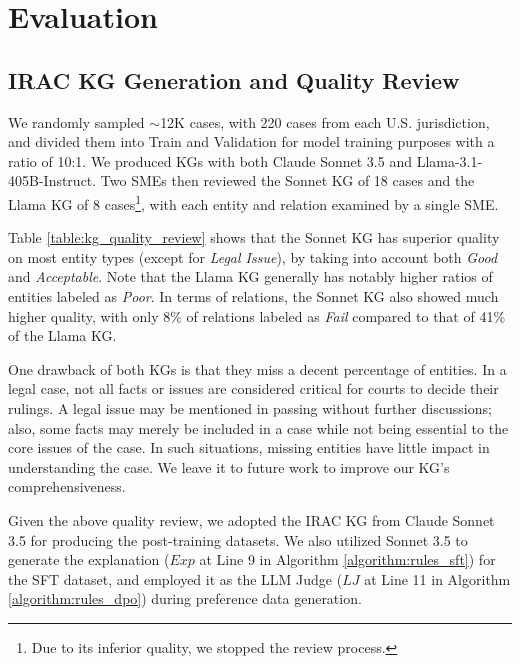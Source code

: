 \section{Evaluation}
\label{section:evaluation}

\subsection{IRAC KG Generation and Quality Review}
\label{section:evaluation_kg_generation}

We randomly sampled $\sim$12K cases, with 220 cases from each U.S. jurisdiction, and divided them into Train and Validation for model training purposes with a ratio of 10:1. We produced KGs with both Claude Sonnet 3.5 and Llama-3.1-405B-Instruct. Two SMEs then reviewed the Sonnet KG of 18 cases and the Llama KG of 8 cases\footnote{Due to its inferior quality, we stopped the review process.}, with each entity and relation examined by a single SME.

Table \ref{table:kg_quality_review} shows that the Sonnet KG has superior quality on most entity types (except for \textit{Legal Issue}), by taking into account both \textit{Good} and \textit{Acceptable}. Note that the Llama KG generally has notably higher ratios of entities labeled as \textit{Poor}. In terms of relations, the Sonnet KG also showed much higher quality, with only 8\% of relations labeled as \textit{Fail} compared to that of 41\% of the Llama KG.

One drawback of both KGs is that they miss a decent percentage of entities. In a legal case, not all facts or issues are considered critical for courts to decide their rulings. A legal issue may be mentioned in passing without further discussions; also, some facts may merely be included in a case while not being essential to the core issues of the case. In such situations, missing entities have little impact in understanding the case. We leave it to future work to improve our KG's comprehensiveness.

Given the above quality review, we adopted the IRAC KG from Claude Sonnet 3.5 for producing the post-training datasets. We also utilized Sonnet 3.5 to generate the explanation ($Exp$ at Line 9 in Algorithm \ref{algorithm:rules_sft}) for the SFT dataset, and employed it as the LLM Judge ($LJ$ at Line 11 in Algorithm \ref{algorithm:rules_dpo}) during preference data generation.

